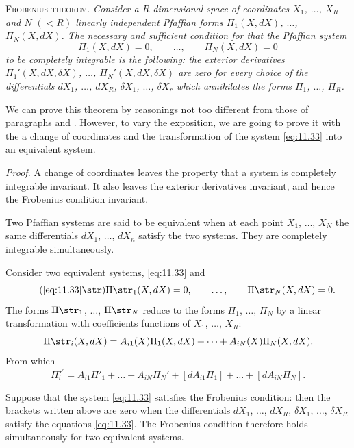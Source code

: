 \somespace

\textsc{Frobenius theorem.} \emph{Consider a $R$ dimensional space of coordinates $X_{1}$, $\dots$, $X_{R}$ and $N$ $(<R)$ linearly independent Pfaffian forms $\Pi_{1}(X,dX)$, $\dots$, $\Pi_{N}(X,dX)$. The necessary and sufficient condition for that the Pfaffian system}
\begin{equation}
  \label{eq:11.33}
  \Pi_{1}(X,dX)=0,\qquad\dots,\qquad\Pi_{N}(X,dX)=0
\end{equation}
\emph{to be completely integrable is the following: the exterior derivatives $\Pi_{1}'(X,dX,\delta X)$, $\dots$, $\Pi_{N}'(X,dX, \delta X)$ are zero for every choice of the differentials $dX_{1}$, $\dots$, $dX_{R}$, $\delta X_{1}$, $\dots$, $\delta X_{r}$ which annihilates the forms $\Pi_{1}$, $\dots$, $\Pi_{R}$.}

\somespace

We can prove this theorem by reasonings not too different from those of paragraphs  and . However, to vary the exposition, we are going to prove it with the a change of coordinates and the transformation of the system \eqref{eq:11.33} into an equivalent system.

\somespace

\emph{Proof.} A change of coordinates leaves the property that a system is completely integrable invariant. It also leaves the exterior derivatives invariant, and hence the Frobenius condition invariant.

Two Pfaffian systems are said to be equivalent when at each point $X_{1}$, $\dots$, $X_{N}$ the same differentials $dX_{1}$, $\dots$, $dX_{n}$ satisfy the two systems. They are completely integrable simultaneously.

Consider two equivalent systems, \eqref{eq:11.33} and 
\begin{equation}
  \label{eq:11.33*}\tag{\ref{eq:11.33}$\str$}
  \Pi\str_{1}(X,dX)=0,\qquad\dots,\qquad\Pi\str_{N}(X,dX)=0.
\end{equation}
The forms $\Pi\str_{1}$, $\dots$, $\Pi\str_{N}$ reduce to the forms $\Pi_{1}$, $\dots$, $\Pi_{N}$ by a linear transformation with coefficients functions of $X_{1}$, $\dots$, $X_{R}$:
\[
\Pi\str_{i}(X,dX)=A_{i1}(X)\Pi_{1}(X,dX)+\dots+A_{iN}(X)\Pi_{N}(X,dX).
\]
From which 
\[
\Pi_{i}^{\star\prime}=A_{i1}\Pi'_{1}+\dots+A_{iN}\Pi_{N}'+[dA_{i1}\Pi_{1}]+\dots+[dA_{iN}\Pi_{N}].
\]

Suppose that the system \eqref{eq:11.33} satisfies the Frobenius condition: then the brackets written above are zero when the differentials $dX_{1}$, $\dots$, $dX_{R}$, $\delta X_{1}$, $\dots$, $\delta X_{R}$ satisfy the equations \eqref{eq:11.33}. The Frobenius condition therefore holds simultaneously for two equivalent systems.

